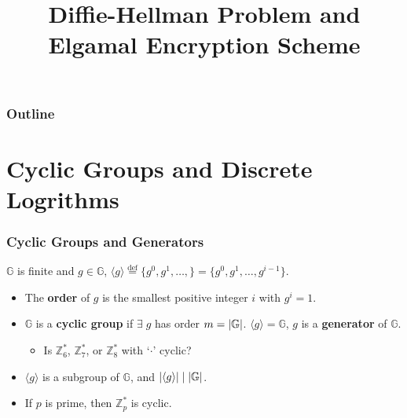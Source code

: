 

\title{Diffie-Hellman Problem and Elgamal Encryption Scheme}


\maketitle
\begin{frame}
\frametitle{Outline}
\tableofcontents
\end{frame}
\section{Cyclic Groups and Discrete Logrithms}
\begin{frame}\frametitle{Cyclic Groups and Generators}
$\mathbb{G}$ is finite and $g \in \mathbb{G}$, 
$ \langle g \rangle \overset{\text{def}}{=} \{ g^0,g^1,\dotsc,\} = \{ g^0,g^1,\dotsc, g^{i-1}\}. $
\begin{itemize}
\item The \textbf{order} of $g$ is the smallest positive integer $i$ with $g^i=1$.
\item $\mathbb{G}$ is a \textbf{cyclic group} if $\exists\;g$ has order $m = \lvert\mathbb{G}\rvert$. $\langle g \rangle = \mathbb{G}$, $g$ is a \textbf{generator} of $\mathbb{G}$.
\begin{exampleblock}{}
\begin{itemize}
\item Is $\mathbb{Z}_6^*$, $\mathbb{Z}_7^*$, or $\mathbb{Z}_8^*$ with `$\cdot$' cyclic? %
\end{itemize}
\end{exampleblock}
\item $\langle g \rangle$ is a subgroup of $\mathbb{G}$, and $\lvert\langle g \rangle\rvert \mid \lvert\mathbb{G}\rvert$.
\item If $p$ is prime, then $\mathbb{Z}^*_p$ is cyclic.
\end{itemize}
\end{frame}
%
